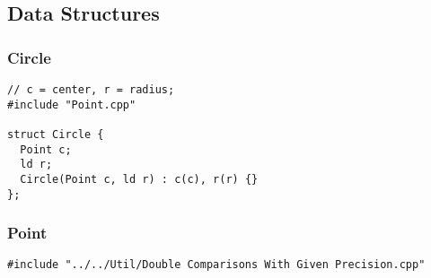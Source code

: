 \documentclass[twoside]{article}
\newcommand{\fileTitleStyle}{\large\underline}
\begin{document}
\begin{multicols*}{2}
\subsection*{Data Structures}
\vspace{2em}
\subsubsectionfont{\centering\bfseries\Large}
\subsubsectionfont{\fileTitleStyle}
\subsubsection*{Circle}
\begin{verbatim}
// c = center, r = radius;
#include "Point.cpp"

struct Circle {
  Point c;
  ld r;
  Circle(Point c, ld r) : c(c), r(r) {}
};
\end{verbatim}

\subsubsectionfont{\centering\bfseries\Large}
\subsubsectionfont{\fileTitleStyle}
\subsubsection*{Point}
\begin{verbatim}
#include "../../Util/Double Comparisons With Given Precision.cpp"


\end{verbatim}
\end{multicols*}
\end{document}
